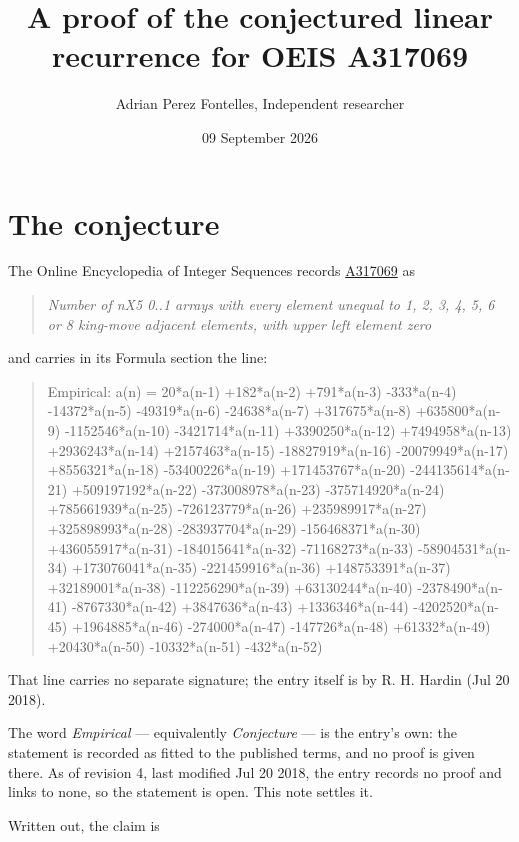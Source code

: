 \documentclass[11pt]{article}
\title{A proof of the conjectured linear recurrence for OEIS A317069}
\author{Adrian Perez Fontelles, Independent researcher}
\date{09 September 2026}
\theoremstyle{definition}
\begin{document}
\maketitle
\section{The conjecture}

The Online Encyclopedia of Integer Sequences records \href{https://oeis.org/A317069}{A317069} as

\begin{quote}\itshape Number of nX5 0..1 arrays with every element unequal to 1, 2, 3, 4, 5, 6 or 8 king-move adjacent elements, with upper left element zero\end{quote}

and carries in its Formula section the line:

\begin{quote}\ttfamily Empirical: a(n) = 20*a(n-1) +182*a(n-2) +791*a(n-3) -333*a(n-4) -14372*a(n-5) -49319*a(n-6) -24638*a(n-7) +317675*a(n-8) +635800*a(n-9) -1152546*a(n-10) -3421714*a(n-11) +3390250*a(n-12) +7494958*a(n-13) +2936243*a(n-14) +2157463*a(n-15) -18827919*a(n-16) -20079949*a(n-17) +8556321*a(n-18) -53400226*a(n-19) +171453767*a(n-20) -244135614*a(n-21) +509197192*a(n-22) -373008978*a(n-23) -375714920*a(n-24) +785661939*a(n-25) -726123779*a(n-26) +235989917*a(n-27) +325898993*a(n-28) -283937704*a(n-29) -156468371*a(n-30) +436055917*a(n-31) -184015641*a(n-32) -71168273*a(n-33) -58904531*a(n-34) +173076041*a(n-35) -221459916*a(n-36) +148753391*a(n-37) +32189001*a(n-38) -112256290*a(n-39) +63130244*a(n-40) -2378490*a(n-41) -8767330*a(n-42) +3847636*a(n-43) +1336346*a(n-44) -4202520*a(n-45) +1964885*a(n-46) -274000*a(n-47) -147726*a(n-48) +61332*a(n-49) +20430*a(n-50) -10332*a(n-51) -432*a(n-52)\end{quote}

That line carries no separate signature; the entry itself is by R. H. Hardin (Jul 20 2018).

The word {\itshape Empirical} --- equivalently {\itshape Conjecture} --- is the entry's own: the statement is recorded as fitted to the published terms, and no proof is given there. As of revision 4, last modified Jul 20 2018, the entry records no proof and links to none, so the statement is open. This note settles it.

Written out, the claim is
\end{document}
